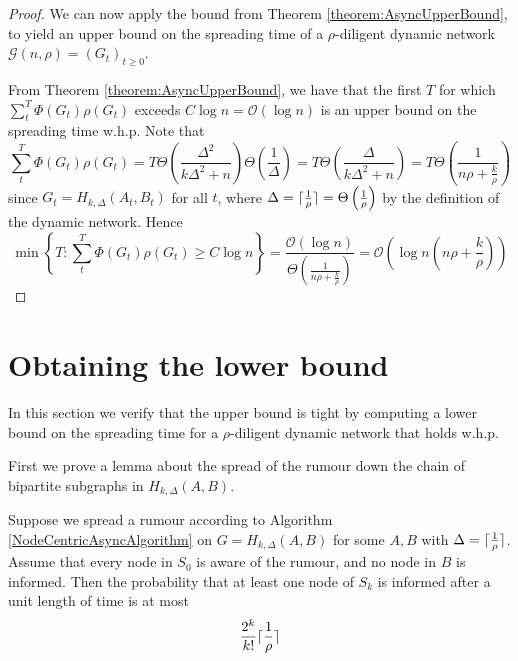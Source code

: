\begin{proof}
	We can now apply the bound from Theorem \ref{theorem:AsyncUpperBound}, to yield an upper bound on the spreading time of a $\rho$-diligent dynamic network $\mathcal{G}(n, \rho) = (G_t)_{t\geq 0}$. 
	
	From Theorem \ref{theorem:AsyncUpperBound}, we have that the first $T$ for which $\sum_t^T \Phi(G_t)\rho(G_t)$ exceeds $C \log n = \mathcal{O}(\log n)$ is an upper bound on the spreading time w.h.p.  Note that 
	$$
		\sum_t^T \Phi(G_t)\rho(G_t)
		= 
		T \Theta\left(\frac{\Delta^2}{k\Delta^2 +n }\right) \Theta\left(\frac{1}{\Delta}\right)
		= 
		T \Theta\left(\frac{\Delta}{k\Delta^2 +n }\right)
		= 
		T \Theta\left(\frac{1}{n \rho + \frac{k}{\rho}}\right)
	$$
	since $G_t = H_{k, \Delta}(A_t,B_t)$ for all $t$, where $\Delta = \lceil\frac{1}{\rho}\rceil = \Theta\left(\frac{1}{\rho}\right)$ by the definition of the dynamic network. Hence 
	$$
		\min \left\{T : \sum_t^T \Phi(G_t)\rho(G_t) \geq C \log n \right\}
		=
		\frac{\mathcal{O}(\log n)}{\Theta\left(\frac{1}{n \rho + \frac{k}{\rho}}\right)}
		= 
		\mathcal{O}\left(\log n \left(n \rho + \frac{k}{\rho}\right)\right)
	$$
\end{proof}

\section{Obtaining the lower bound}\label{section:adversarialLowerBound}

In this section we verify that the upper bound is tight by computing a lower bound on the spreading time for a $\rho$-diligent dynamic network that holds w.h.p.

First we prove a lemma about the spread of the rumour down the chain of bipartite subgraphs in $H_{k, \Delta}(A,B)$.

\begin{lemma}\label{lemma:H_k,DeltaABOneStep}
	Suppose we spread a rumour according to Algorithm \ref{NodeCentricAsyncAlgorithm} on $G = H_{k, \Delta}(A,B)$ for some $A, B$ with $\Delta = \lceil\frac{1}{\rho}\rceil$. Assume that every node in $S_0$ is aware of the rumour, and no node in $B$ is informed. Then the probability that at least one node of $S_k$ is informed after a unit length of time is at most
	$$
		\frac{2^k}{k!}\lceil\frac{1}{\rho}\rceil
	$$	
\end{lemma}

